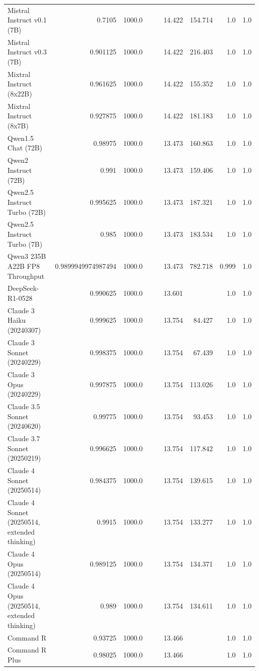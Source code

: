 \begin{table}[htp]
{\begin{tabular}{lrrrrrrrr}
Mistral Instruct v0.1 (7B) & 0.7105 & 1000.0 &  &  & 14.422 & 154.714 & 1.0 & 1.0 \\
Mistral Instruct v0.3 (7B) & 0.901125 & 1000.0 &  &  & 14.422 & 216.403 & 1.0 & 1.0 \\
Mixtral Instruct (8x22B) & 0.961625 & 1000.0 &  &  & 14.422 & 155.352 & 1.0 & 1.0 \\
Mixtral Instruct (8x7B) & 0.927875 & 1000.0 &  &  & 14.422 & 181.183 & 1.0 & 1.0 \\
Qwen1.5 Chat (72B) & 0.98975 & 1000.0 &  &  & 13.473 & 160.863 & 1.0 & 1.0 \\
Qwen2 Instruct (72B) & 0.991 & 1000.0 &  &  & 13.473 & 159.406 & 1.0 & 1.0 \\
Qwen2.5 Instruct Turbo (72B) & 0.995625 & 1000.0 &  &  & 13.473 & 187.321 & 1.0 & 1.0 \\
Qwen2.5 Instruct Turbo (7B) & 0.985 & 1000.0 &  &  & 13.473 & 183.534 & 1.0 & 1.0 \\
Qwen3 235B A22B FP8 Throughput & 0.9899949974987494 & 1000.0 &  &  & 13.473 & 782.718 & 0.999 & 1.0 \\
DeepSeek-R1-0528 & 0.990625 & 1000.0 &  &  & 13.601 &  & 1.0 & 1.0 \\
Claude 3 Haiku (20240307) & 0.999625 & 1000.0 &  &  & 13.754 & 84.427 & 1.0 & 1.0 \\
Claude 3 Sonnet (20240229) & 0.998375 & 1000.0 &  &  & 13.754 & 67.439 & 1.0 & 1.0 \\
Claude 3 Opus (20240229) & 0.997875 & 1000.0 &  &  & 13.754 & 113.026 & 1.0 & 1.0 \\
Claude 3.5 Sonnet (20240620) & 0.99775 & 1000.0 &  &  & 13.754 & 93.453 & 1.0 & 1.0 \\
Claude 3.7 Sonnet (20250219) & 0.996625 & 1000.0 &  &  & 13.754 & 117.842 & 1.0 & 1.0 \\
Claude 4 Sonnet (20250514) & 0.984375 & 1000.0 &  &  & 13.754 & 139.615 & 1.0 & 1.0 \\
Claude 4 Sonnet (20250514, extended thinking) & 0.9915 & 1000.0 &  &  & 13.754 & 133.277 & 1.0 & 1.0 \\
Claude 4 Opus (20250514) & 0.989125 & 1000.0 &  &  & 13.754 & 134.371 & 1.0 & 1.0 \\
Claude 4 Opus (20250514, extended thinking) & 0.989 & 1000.0 &  &  & 13.754 & 134.611 & 1.0 & 1.0 \\
Command R & 0.93725 & 1000.0 &  &  & 13.466 &  & 1.0 & 1.0 \\
Command R Plus & 0.98025 & 1000.0 &  &  & 13.466 &  & 1.0 & 1.0 \\

\end{tabular}}
\end{table}
